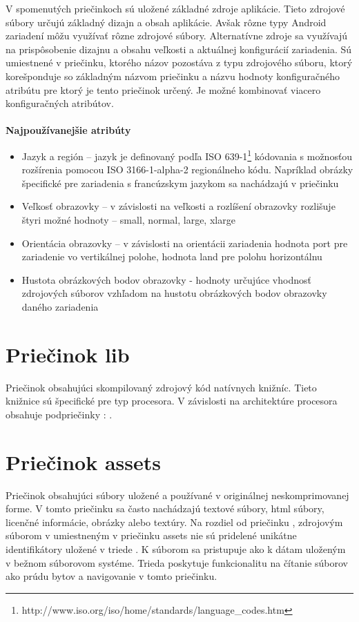 \noindent V spomenutých priečinkoch sú uložené základné zdroje aplikácie. Tieto zdrojové súbory určujú základný dizajn a obsah aplikácie. Avšak rôzne typy Android zariadení môžu využívať rôzne zdrojové súbory. Alternatívne zdroje sa využívajú na prispôsobenie dizajnu a obsahu veľkosti a aktuálnej konfigurácií zariadenia. Sú umiestnené v priečinku, ktorého názov pozostáva z typu zdrojového súboru, ktorý korešponduje so základným názvom priečinku a názvu hodnoty konfiguračného atribútu pre ktorý je tento priečinok určený. Je možné kombinovať viacero konfiguračných atribútov.\\\\
\textbf{Najpoužívanejšie atribúty}
\begin{itemize}
\item Jazyk a región – jazyk je definovaný podľa ISO 639-1\footnote{http://www.iso.org/iso/home/standards/language\_codes.htm} kódovania s možnosťou rozšírenia pomocou ISO 3166-1-alpha-2 regionálneho kódu. Napríklad obrázky špecifické pre zariadenia s francúzskym jazykom sa nachádzajú v priečinku 
\item Veľkosť obrazovky –  v závislosti na veľkosti a rozlíšení obrazovky rozlišuje štyri možné hodnoty -- small, normal, large, xlarge
\item Orientácia obrazovky – v závislosti na orientácii zariadenia hodnota port pre zariadenie vo vertikálnej polohe, hodnota land pre polohu horizontálnu
\item Hustota obrázkových bodov obrazovky -  hodnoty určujúce vhodnosť zdrojových súborov vzhľadom na hustotu obrázkových bodov obrazovky daného zariadenia
\end{itemize}


\section{Priečinok lib}
\label{lib}
Priečinok obsahujúci skompilovaný zdrojový kód natívnych knižníc. Tieto knižnice sú špecifické pre typ procesora. V závislosti na architektúre procesora obsahuje podpriečinky : .

\section{Priečinok assets}
\label{assets}
Priečinok obsahujúci súbory uložené a používané v originálnej neskomprimovanej forme. V tomto priečinku sa často nachádzajú textové súbory, html súbory, licenčné informácie, obrázky alebo textúry. Na rozdiel od priečinku , zdrojovým súborom v umiestneným v priečinku assets nie sú pridelené unikátne identifikátory uložené v triede . K súborom sa pristupuje ako k dátam uloženým v bežnom súborovom systéme. Trieda  poskytuje funkcionalitu na čítanie súborov ako prúdu bytov a  navigovanie v tomto priečinku.

